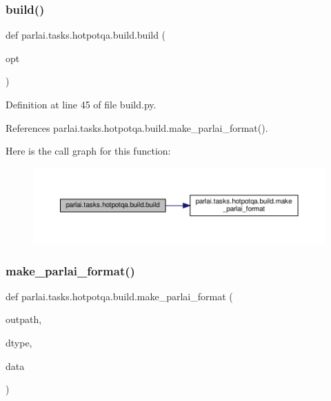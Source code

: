 \subsubsection{\texorpdfstring{build()}{build()}}
{\footnotesize\ttfamily def parlai.\+tasks.\+hotpotqa.\+build.\+build (\begin{DoxyParamCaption}\item[{}]{opt }\end{DoxyParamCaption})}



Definition at line 45 of file build.\+py.



References parlai.\+tasks.\+hotpotqa.\+build.\+make\+\_\+parlai\+\_\+format().

Here is the call graph for this function\+:
\nopagebreak
\begin{figure}[H]
\begin{center}
\leavevmode
\includegraphics[width=350pt]{namespaceparlai_1_1tasks_1_1hotpotqa_1_1build_a98853aa474b04fb50fa49cec3f1c3882_cgraph}
\end{center}
\end{figure}
\mbox{\label{namespaceparlai_1_1tasks_1_1hotpotqa_1_1build_a11cd6bdcce0c267fa7bebb496d930b44}} 
\subsubsection{\texorpdfstring{make\+\_\+parlai\+\_\+format()}{make\_parlai\_format()}}
{\footnotesize\ttfamily def parlai.\+tasks.\+hotpotqa.\+build.\+make\+\_\+parlai\+\_\+format (\begin{DoxyParamCaption}\item[{}]{outpath,  }\item[{}]{dtype,  }\item[{}]{data }\end{DoxyParamCaption})}



